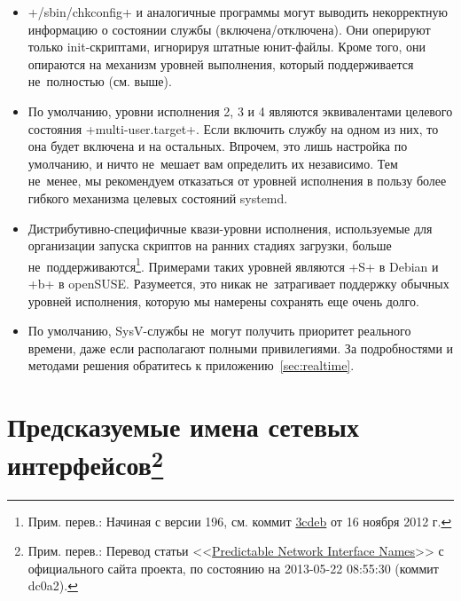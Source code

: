\documentclass[10pt,oneside,a4paper]{article}
\newcommand{\sfnote}[1]{\texorpdfstring{\protect\footnote%
	{Прим. перев.: #1}}{}}
\begin{document}
\begin{itemize}
		ограничения. Хотя все уровни исполнения SysV имеют
		соответствующие им целевые состояния (target units), далеко
		не~все целевые состояния имеют соответствующие им уровни
		исполнения. Это обусловлено тем, что механизм целевых состояний
		отличается гораздо б\'{о}льшей гибкостью и эффективностью,
		чем система уровней исполнения. Как следствие, в некоторых
		случаях попытка узнать текущий уровень исполнения (например, 
		при помощи +/sbin/runlevel+) может вернуть просто <<+N+>> (т.е.
		<<уровень выполнения неизвестен>>), что приведет к нарушению
		работы скриптов, использующих явную проверку текущего уровня
		исполнения. Избегайте подобных проверок.
	\item +/sbin/chkconfig+ и аналогичные программы могут выводить
		некорректную информацию о состоянии службы (включена/отключена).
		Они оперируют только init-скриптами, игнорируя штатные
		юнит-файлы. Кроме того, они опираются на механизм уровней
		выполнения, который поддерживается не~полностью (см. выше).
	\item По умолчанию, уровни исполнения 2, 3 и 4 являются эквивалентами
		целевого состояния +multi-user.target+. Если включить службу на
		одном из них, то она будет включена и на остальных. Впрочем, это
		лишь настройка по умолчанию, и ничто не~мешает вам определить их
		независимо. Тем не~менее, мы рекомендуем отказаться от уровней
		исполнения в пользу более гибкого механизма целевых состояний
		systemd.
	\item Дистрибутивно-специфичные квази-уровни исполнения, используемые
		для организации запуска скриптов на ранних стадиях загрузки, больше
		не~поддерживаются\footnote{Прим. перев.: Начиная с версии 196,
		см. коммит
		\href{http://cgit.freedesktop.org/systemd/systemd/commit/?id=3cdebc217c42c8529086f2965319b6a48eaaeabe}%
		{3cdeb} от 16 ноября 2012 г.}. Примерами таких уровней являются
		+S+ в Debian и +b+ в openSUSE. Разумеется, это никак
		не~затрагивает поддержку обычных уровней исполнения, которую мы
		намерены сохранять еще очень долго.
	\item По умолчанию, SysV-службы не~могут получить приоритет реального
		времени, даже если располагают полными привилегиями. За
		подробностями и методами решения обратитесь к
		приложению~\ref{sec:realtime}.
\end{itemize}


\section{Предсказуемые имена сетевых интерфейсов\sfnote{Перевод статьи
<<\href{http://www.freedesktop.org/wiki/Software/systemd/PredictableNetworkInterfaceNames}%
{Predictable Network Interface Names}>> с официального сайта проекта, по
состоянию на 2013-05-22 08:55:30 (коммит dc0a2).}}
\end{document}
